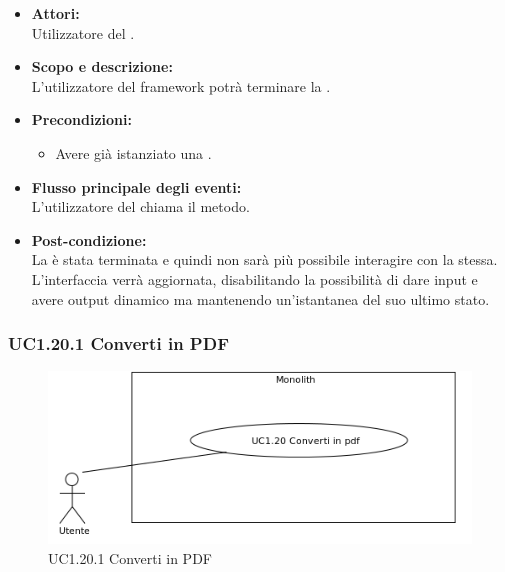 \begin{itemize}
	\item \textbf{Attori:}
	\\Utilizzatore del .
	\item \textbf{Scopo e descrizione:} 
	\\L'utilizzatore del framework potrà terminare la .
	\item \textbf{Precondizioni:}
	\begin{itemize}
		\item Avere già istanziato una .
	\end{itemize}
	\item \textbf{Flusso principale degli eventi:}
	\\L'utilizzatore del  chiama il metodo.
	\item \textbf{Post-condizione:}
	\\La {} è stata terminata e quindi non sarà più possibile interagire con la stessa. L'interfaccia verrà aggiornata, disabilitando la possibilità di dare input e avere output dinamico ma mantenendo un'istantanea del suo ultimo stato.
\end{itemize}

\subsubsection{UC1.20.1 Converti in PDF} \label{UC1.20.1}

\begin{figure}[H]
	\centering
	\includegraphics[width=15cm]{../../documenti/AnalisiDeiRequisiti/Diagrammi_img/uc1_20.png}
	\caption{UC1.20.1 Converti in PDF}
\end{figure}

